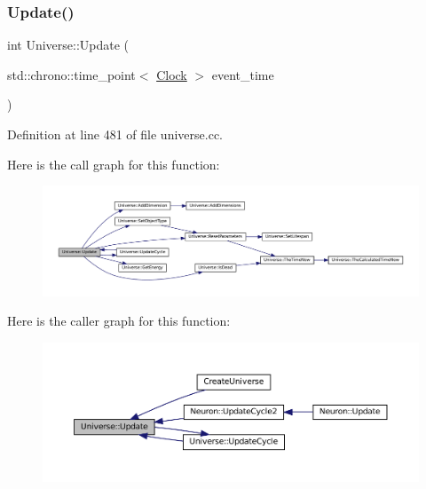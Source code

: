 \subsubsection{\texorpdfstring{Update()}{Update()}}
{\footnotesize\ttfamily int Universe\+::\+Update (\begin{DoxyParamCaption}\item[{std\+::chrono\+::time\+\_\+point$<$ \mbox{\hyperlink{universe_8h_a0ef8d951d1ca5ab3cfaf7ab4c7a6fd80}{Clock}} $>$}]{event\+\_\+time }\end{DoxyParamCaption})}



Definition at line 481 of file universe.\+cc.

Here is the call graph for this function\+:\nopagebreak
\begin{figure}[H]
\begin{center}
\leavevmode
\includegraphics[width=350pt]{class_universe_a64ee5a2c7e86c56fa426acb750438ce9_cgraph}
\end{center}
\end{figure}
Here is the caller graph for this function\+:\nopagebreak
\begin{figure}[H]
\begin{center}
\leavevmode
\includegraphics[width=350pt]{class_universe_a64ee5a2c7e86c56fa426acb750438ce9_icgraph}
\end{center}
\end{figure}
\mbox{\label{class_universe_a0d79e614e1af951c06b78cb5768f9c8e}} 
